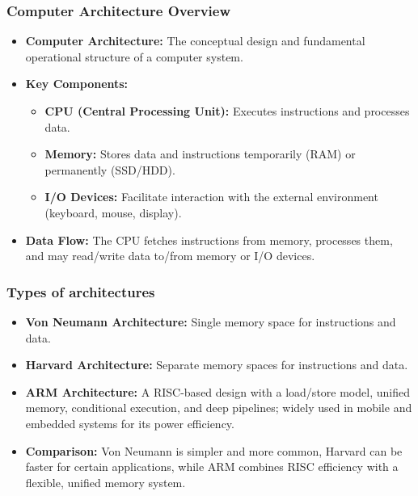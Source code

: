 \begin{frame} 
    \frametitle{Computer Architecture Overview}
    \begin{itemize}
        \item \textbf{Computer Architecture:} The conceptual design and fundamental operational structure of a computer system.
        \item \textbf{Key Components:}
        \begin{itemize}
            \item \textbf{CPU (Central Processing Unit):} Executes instructions and processes data.
            \item \textbf{Memory:} Stores data and instructions temporarily (RAM) or permanently (SSD/HDD).
            \item \textbf{I/O Devices:} Facilitate interaction with the external environment (keyboard, mouse, display).
        \end{itemize}
        \item \textbf{Data Flow:} The CPU fetches instructions from memory, processes them, and may read/write data to/from memory or I/O devices.
    \end{itemize}
\end{frame}

\begin{frame}
\frametitle{Types of architectures}
\begin{itemize}
    \item \textbf{Von Neumann Architecture:} Single memory space for instructions and data.
    \item \textbf{Harvard Architecture:} Separate memory spaces for instructions and data.
    \item \textbf{ARM Architecture:} A RISC-based design with a load/store model, unified memory, conditional execution, and deep pipelines; widely used in mobile and embedded systems for its power efficiency.
    \item \textbf{Comparison:} Von Neumann is simpler and more common, Harvard can be faster for certain applications, while ARM combines RISC efficiency with a flexible, unified memory system.
\end{itemize}   
\end{frame}


